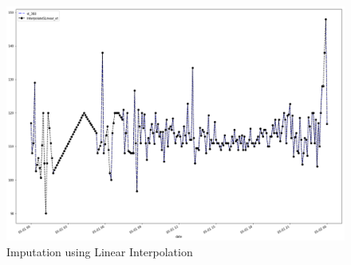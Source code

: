 \begin{figure}[H]
\centering
\includegraphics[scale=.33]{img/linear.png} 
\caption{Imputation using Linear Interpolation }
\label{fig:presteps}
\end{figure}


%


